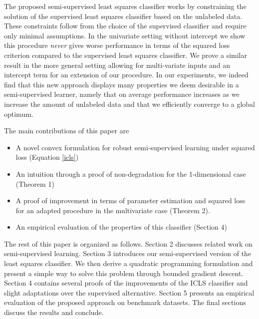 \documentclass{llncs}
\begin{document}
The proposed semi-supervised least squares classifier works by constraining the solution of the supervised least squares classifier based on the unlabeled data. These constraints follow from the choice of the supervised classifier and require only minimal assumptions. In the univariate setting without intercept we show this procedure \emph{never} gives worse performance in terms of the squared loss criterion compared to the supervised least squares classifier. We prove a similar result in the more general setting allowing for multi-variate inputs and an intercept term for an extension of our procedure. In our experiments, we indeed find that this new approach displays many properties we deem desirable in a semi-supervised learner, namely that on average performance increases as we increase the amount of unlabeled data and that we efficiently converge to a global optimum.

The main contributions of this paper are

\begin{itemize}
  \item A novel convex formulation for robust semi-supervised learning under squared loss (Equation \ref{icls})
  \item An intuition through a proof of non-degradation for the 1-dimensional case (Theorem 1)
  \item A proof of improvement in terms of parameter estimation and squared loss for an adapted procedure in the multivariate case (Theorem 2).
  \item An empirical evaluation of the properties of this classifier (Section 4)
\end{itemize}

The rest of this paper is organized as follows. Section 2 discusses related work on semi-supervised learning. Section 3 introduces our semi-supervised version of the least squares classifier. We then derive a quadratic programming formulation and present a simple way to solve this problem through bounded gradient descent. Section 4 contains several proofs of the improvements of the ICLS classifier and slight adaptations over the supervised alternative. Section 5 presents an empirical evaluation of the proposed approach on benchmark datasets. The final sections discuss the results and conclude.
\end{document}
